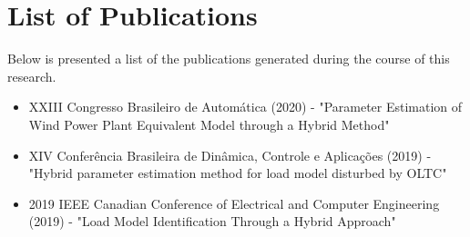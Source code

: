 \chapter{List of Publications}
\label{ch: Publications}

Below is presented a list of the publications generated during the course of this research.

\begin{itemize}
	\item XXIII Congresso Brasileiro de Autom\'atica (2020) - "Parameter Estimation of Wind Power Plant Equivalent Model through a Hybrid Method"
	\item XIV Conferência Brasileira de Dinâmica, Controle e Aplicações (2019) - "Hybrid parameter estimation method for load model disturbed by OLTC"
	\item 2019 IEEE Canadian Conference of Electrical and Computer Engineering (2019) - "Load Model Identification Through a Hybrid Approach"
\end{itemize}